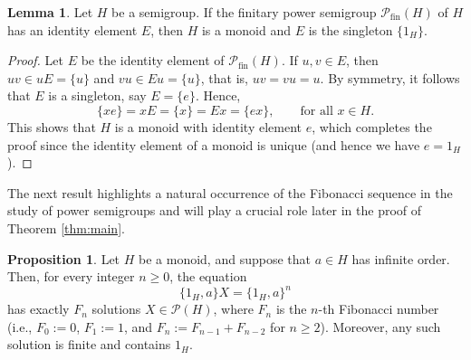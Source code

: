 \documentclass[11pt,reqno]{amsart}
\theoremstyle{definition}
\newtheorem{proposition}[theorem]{Proposition}
\newtheorem{lemma}[theorem]{Lemma}
\theoremstyle{remark}
\theoremstyle{theoremdd}
\newcommand{\Pfin}{\mathcal P_{\mathrm{fin}}}
\renewcommand{\,}{\kern 0.1em}
\begin{document}
\begin{lemma}\label{lem:identity-reconstruction}
Let $H$ be a semigroup. If the finitary power semigroup $\Pfin(H)$ of $H$ has an identity element $E$, then $H$
is a monoid and $E$ is the singleton $\{1_H\}$.
\end{lemma}

\begin{proof}
Let $E$ be the identity element of $\Pfin(H)$. If $u, v \in E$, then $uv \in uE = \{u\}$ and $vu \in Eu = \allowbreak \{u\}$, that is, $uv = vu = u$. By symmetry, it follows that $E$ is a singleton, say $E = \{e\}$. Hence,
\[
\{xe\} = xE = \{x\} = Ex = \{ex\},
\qquad\text{for all } x \in H.
\]
This shows that $H$ is a monoid with identity element $e$, which completes the proof since the identity element of a monoid is unique (and hence we have $e = 1_H$).
\end{proof}

The next result highlights a natural occurrence of the Fibonacci sequence in the study of power semigroups and will play a crucial role later in the proof of Theorem \ref{thm:main}.

\begin{proposition}
\label{prop:fib-count}
Let $H$ be a monoid, and suppose that $a \in H$ has infinite order.
Then, for every integer $n \ge 0$, the equation
\begin{equation}
\label{lem:fib-count:eq(1)}
\{1_H,a\} X = \{1_H,a\}^n
\end{equation}
has exactly $F_n$ solutions $X \in \mathcal P(H)$, where
$F_n$ is the $n$-th Fibonacci number (i.e., $F_0 := 0$, $F_1 := \allowbreak 1$, and $F_n := F_{n-1} + F_{n-2}$ for $n \ge 2$). Moreover, any such solution is finite and contains $1_H$.
\end{proposition}
\end{document}
